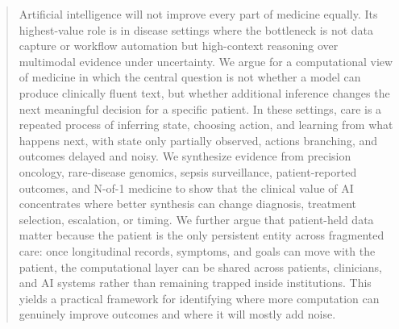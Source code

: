 \documentclass[11pt]{article}
\begin{document}
\begin{titlepage}

\end{titlepage}
\nopagecolor
\clearpage
{}

\begin{abstract}
Artificial intelligence will not improve every part of medicine equally. Its highest-value role is in disease settings where the bottleneck is not data capture or workflow automation but high-context reasoning over multimodal evidence under uncertainty. We argue for a computational view of medicine in which the central question is not whether a model can produce clinically fluent text, but whether additional inference changes the next meaningful decision for a specific patient. In these settings, care is a repeated process of inferring state, choosing action, and learning from what happens next, with state only partially observed, actions branching, and outcomes delayed and noisy. We synthesize evidence from precision oncology, rare-disease genomics, sepsis surveillance, patient-reported outcomes, and N-of-1 medicine to show that the clinical value of AI concentrates where better synthesis can change diagnosis, treatment selection, escalation, or timing. We further argue that patient-held data matter because the patient is the only persistent entity across fragmented care: once longitudinal records, symptoms, and goals can move with the patient, the computational layer can be shared across patients, clinicians, and AI systems rather than remaining trapped inside institutions. This yields a practical framework for identifying where more computation can genuinely improve outcomes and where it will mostly add noise.
\end{abstract}
\end{document}
